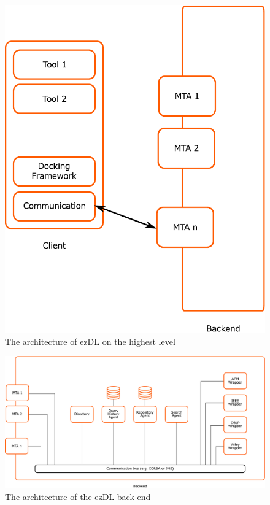 \documentclass[12pt]{book}
\begin{document}
\begin{figure}[t]
\begin{center}
  \includegraphics[width=.75\linewidth]{system-architecture}
  \caption[The high-level architecture]{The architecture of ezDL on the highest level}
  \label{fig:systemarchitecture}
\end{center}
\end{figure}

\begin{figure}[t]
\begin{center}
  \includegraphics[width=.75\linewidth]{backend-architecture}
  \caption[The back end architecture]{The architecture of the ezDL back end}
  \label{fig:backendarchitecture}
\end{center}
\end{figure}
\end{document}
